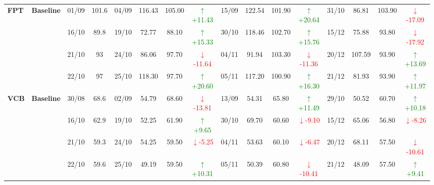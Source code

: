 {\begin{longtable}{llcc|cccc|cccc|cccc}
\multirow{4}{*}{\textbf{FPT}}
& \textbf{Baseline}
& 01/09 & 101.6 & 04/09 & 116.43 & 105.00 & \textcolor{green}{\(\uparrow\)+11.43} & 15/09 & 122.54 & 101.90 & \textcolor{green}{\(\uparrow\)+20.64} & 31/10 & 86.81 & 103.90 & \textcolor{red}{\(\downarrow\)-17.09} \\
& & 16/10 & 89.8 & 19/10 & 72.77 & 88.10 & \textcolor{green}{\(\uparrow\)+15.33} & 30/10 & 118.46 & 102.70 & \textcolor{green}{\(\uparrow\)+15.76} & 15/12 & 75.88 & 93.80 & \textcolor{red}{\(\downarrow\)-17.92} \\
& & 21/10 & 93 & 24/10 & 86.06 & 97.70 & \textcolor{red}{\(\downarrow\)-11.64} & 04/11 & 91.94 & 103.30 & \textcolor{red}{\(\downarrow\)-11.36} & 20/12 & 107.59 & 93.90 & \textcolor{green}{\(\uparrow\)+13.69} \\
& & 22/10 & 97 & 25/10 & 118.30 & 97.70 & \textcolor{green}{\(\uparrow\)+20.60} & 05/11 & 117.20 & 100.90 & \textcolor{green}{\(\uparrow\)+16.30} & 21/12 & 81.93 & 93.90 & \textcolor{green}{\(\uparrow\)+11.97} \\
\midrule

\multirow{4}{*}{\textbf{VCB}}
& \textbf{Baseline}
& 30/08 & 68.6 & 02/09 & 54.79 & 68.60 & \textcolor{red}{\(\downarrow\)-13.81} & 13/09 & 54.31 & 65.80 & \textcolor{green}{\(\uparrow\)+11.49} & 29/10 & 50.52 & 60.70 & \textcolor{green}{\(\uparrow\)+10.18} \\
& & 16/10 & 62.9 & 19/10 & 52.25 & 61.90 & \textcolor{green}{\(\uparrow\)+9.65} & 30/10 & 69.70 & 60.60 & \textcolor{red}{\(\downarrow\)-9.10} & 15/12 & 65.06 & 56.80 & \textcolor{red}{\(\downarrow\)-8.26} \\
& & 21/10 & 59.3 & 24/10 & 54.25 & 59.50 & \textcolor{red}{\(\downarrow\)-5.25} & 04/11 & 53.63 & 60.10 & \textcolor{red}{\(\downarrow\)-6.47} & 20/12 & 68.11 & 57.50 & \textcolor{red}{\(\downarrow\)-10.61} \\
& & 22/10 & 59.6 & 25/10 & 49.19 & 59.50 & \textcolor{green}{\(\uparrow\)+10.31} & 05/11 & 50.39 & 60.80 & \textcolor{red}{\(\downarrow\)-10.41} & 21/12 & 48.09 & 57.50 & \textcolor{green}{\(\uparrow\)+9.41} \\
\midrule


\end{longtable}}
